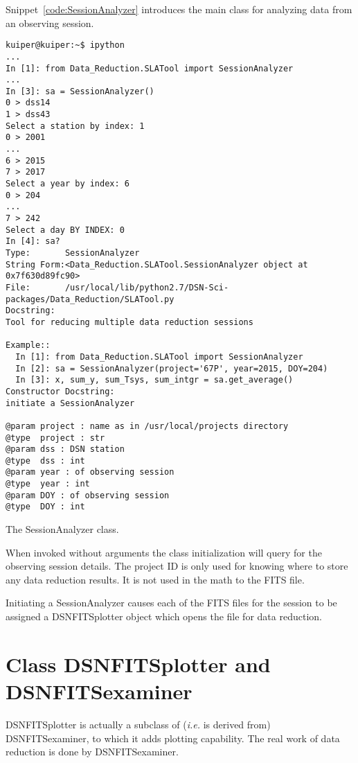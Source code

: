 \documentclass[letterpaper,11pt]{book}
\begin{document}
Snippet~\ref{code:SessionAnalyzer} introduces the main class for analyzing data
from an observing session.
\begin{code}[h!tb]
\begin{center}
{\small \begin{verbatim}
kuiper@kuiper:~$ ipython
...
In [1]: from Data_Reduction.SLATool import SessionAnalyzer
...
In [3]: sa = SessionAnalyzer()
0 > dss14
1 > dss43
Select a station by index: 1
0 > 2001
...
6 > 2015
7 > 2017
Select a year by index: 6
0 > 204
...
7 > 242
Select a day BY INDEX: 0
In [4]: sa?
Type:       SessionAnalyzer
String Form:<Data_Reduction.SLATool.SessionAnalyzer object at 0x7f630d89fc90>
File:       /usr/local/lib/python2.7/DSN-Sci-packages/Data_Reduction/SLATool.py
Docstring:
Tool for reducing multiple data reduction sessions

Example::
  In [1]: from Data_Reduction.SLATool import SessionAnalyzer
  In [2]: sa = SessionAnalyzer(project='67P', year=2015, DOY=204)
  In [3]: x, sum_y, sum_Tsys, sum_intgr = sa.get_average()
Constructor Docstring:
initiate a SessionAnalyzer

@param project : name as in /usr/local/projects directory
@type  project : str
@param dss : DSN station
@type  dss : int
@param year : of observing session
@type  year : int
@param DOY : of observing session
@type  DOY : int
\end{verbatim}
}\caption[Session analayzer class]{\label{code:SessionAnalyzer}The SessionAnalyzer class.}
\end{center}
\end{code}
When invoked without arguments the class initialization will query for the
observing session details.  The project ID is only used for knowing where
to store any data reduction results.  It is not used in the math to the FITS
file.

Initiating a {\ttfamily SessionAnalyzer} causes
each of the FITS files for the session to be assigned a
{\ttfamily DSNFITSplotter} object which opens the file for data reduction.

\section{Class {\ttfamily DSNFITSplotter} and {\ttfamily DSNFITSexaminer}}

{\ttfamily DSNFITSplotter} is actually a subclass of ({\itshape i.e.} is
derived from) {\ttfamily DSNFITSexaminer}, to which it adds plotting capability.
The real work of data reduction is done by {\ttfamily DSNFITSexaminer}.
\end{document}
